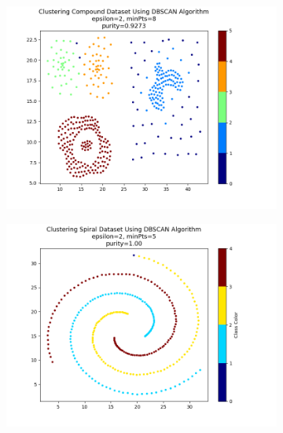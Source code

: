 \documentclass[12pt, a4paper]{article}
\begin{document}
\begin{figure}[h]
\begin{subfigure}{0.45\linewidth}
        \caption{}
        \label{rings}
    \end{subfigure}
    \hfill
    \begin{subfigure}{0.45\linewidth}
        \centering
        \includegraphics[width=\linewidth]{images/q2/compound.png}
        \caption{}
        \label{compound}
    \end{subfigure}
    \newline
    \hfill
    \begin{subfigure}{0.45\linewidth}
        \centering
        \includegraphics[width=\linewidth]{images/q2/spiral.png}
        \caption{}
        \label{spiral}
    \end{subfigure}
    \caption{}
    \label{dbscan}
\end{figure}
\end{document}
